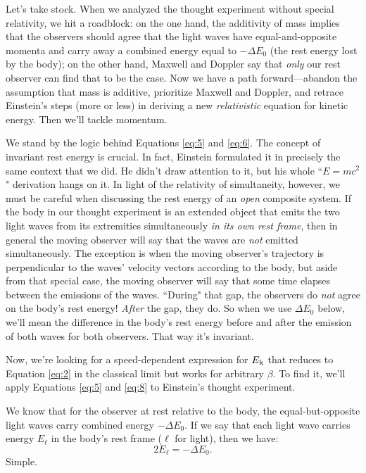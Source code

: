 \documentclass[12pt]{article}
\begin{document}
Let's take stock. When we analyzed the thought experiment without special relativity, we hit a roadblock: on the one hand, the additivity of mass implies that the observers should agree that the light waves have equal-and-opposite momenta and carry away a combined energy equal to $-\Delta E_0$ (the rest energy lost by the body); on the other hand, Maxwell and Doppler say that \emph{only} our rest observer can find that to be the case. Now we have a path forward---abandon the assumption that mass is additive, prioritize Maxwell and Doppler, and retrace Einstein's steps (more or less) in deriving a new \emph{relativistic} equation for kinetic energy. Then we'll tackle momentum.

We stand by the logic behind Equations \ref{eq:5} and \ref{eq:6}. The concept of invariant rest energy is crucial. In fact, Einstein formulated it in precisely the same context that we did. He didn't draw attention to it, but his whole ``$E=mc^2$" derivation hangs on it. In light of the relativity of simultaneity, however, we must be careful when discussing the rest energy of an \emph{open} composite system. If the body in our thought experiment is an extended object that emits the two light waves from its extremities simultaneously \emph{in its own rest frame}, then in general the moving observer will say that the waves are \emph{not} emitted simultaneously. The exception is when the moving observer's trajectory is perpendicular to the waves' velocity vectors according to the body, but aside from that special case, the moving observer will say that some time elapses between the emissions of the waves. ``During" that gap, the observers do \emph{not} agree on the body's rest energy! \emph{After} the gap, they do. So when we use $\Delta E_0$ below, we'll mean the difference in the body's rest energy before and after the emission of both waves for both observers. That way it's invariant.

Now, we're looking for a speed-dependent expression for $E_{\mkern.5mu \textrm{k}}$ that reduces to Equation \ref{eq:2} in the classical limit but works for arbitrary $\beta$. To find it, we'll apply Equations \ref{eq:5} and \ref{eq:8} to Einstein's thought experiment.

We know that for the observer at rest relative to the body, the equal-but-opposite light waves carry combined energy $-\Delta E_0$. If we say that each light wave carries energy $E_{\ell}$ in the body's rest frame ($\ell$ for light), then we have:
\begin{equation}\label{eq:9}
2E_{\ell}=-\Delta E_0.
\end{equation}
Simple.
\end{document}
